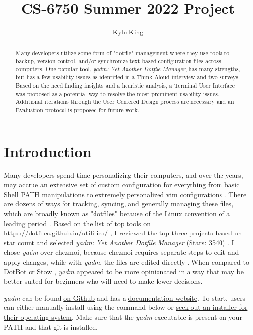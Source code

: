 \documentclass[letterpaper]{jdf}
\author{Kyle King}
\title{CS-6750 Summer 2022 Project}
\begin{document}
\maketitle

\begin{abstract}
    Many developers utilize some form of "dotfile" management where they use tools to backup, version control, and/or synchronize text-based configuration files across computers. One popular tool, \emph{yadm: Yet Another Dotfile Manager}, has many strengths, but has a few usability issues as identified in a Think-Aloud interview and two surveys. Based on the need finding insights and a heuristic analysis, a Terminal User Interface was proposed as a potential way to resolve the most prominent usability issues. Additional iterations through the User Centered Design process are necessary and an Evaluation protocol is proposed for future work.
\end{abstract}

\section{Introduction}
Many developers spend time personalizing their computers, and over the years, may accrue an extensive set of custom configuration for everything from basic Shell PATH manipulations to extremely personalized vim configurations \citep{Hahn2022}. There are dozens of ways for tracking, syncing, and generally managing these files, which are broadly known as "dotfiles" because of the Linux convention of a leading period \citep{Borkiewicz2019}. Based on the list of top tools on \href{https://dotfiles.github.io/utilities/}{https://dotfiles.github.io/utilities/} \citep{DotfileChoices}, I reviewed the top three projects based on star count and selected \emph{yadm: Yet Another Dotfile Manager} (Stars: 3540) \citep{TheYadm}. I chose \emph{yadm} over chezmoi, because chezmoi requires separate steps to edit and apply changes, while with \emph{yadm}, the files are edited directly \citep{ChezmoiTable}. When compared to DotBot \citep{Athalye2014} or Stow \citep{Invergo2012}, \emph{yadm} appeared to be more opinionated in a way that may be better suited for beginners who will need to make fewer decisions.

\emph{yadm} can be found \href{https://github.com/TheLocehiliosan/yadm}{on Github} and has a \href{https://yadm.io/docs/overview}{documentation website}. To start, users can either manually install using the command below \citep{YadmQuickStart} or \href{https://yadm.io/docs/install}{seek out an installer for their operating system}. Make sure that the \emph{yadm} executable is present on your PATH and that git is installed.
\end{document}
